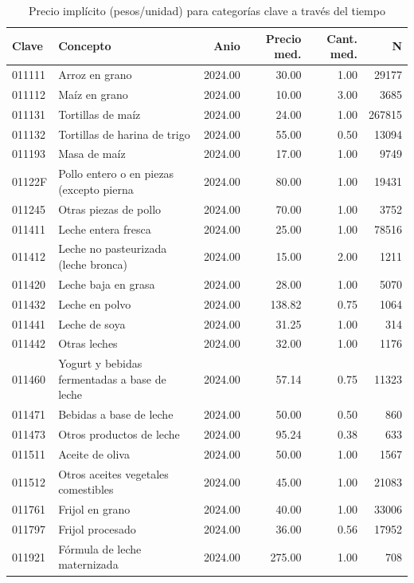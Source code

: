 \begin{table}[ht]
\centering
\caption{Precio impl\'icito (pesos/unidad) para categor\'ias clave a trav\'es del tiempo} 
\label{tab:20b_precio_categorias_clave}
\begin{tabular}{llrrrr}
  \toprule
Clave & Concepto & Anio & Precio med. & Cant. med. & N \\ 
  \midrule
011111 & Arroz en grano & 2024.00 & 30.00 & 1.00 & 29177 \\ 
  011112 & Maíz en grano & 2024.00 & 10.00 & 3.00 & 3685 \\ 
  011131 & Tortillas de maíz & 2024.00 & 24.00 & 1.00 & 267815 \\ 
  011132 & Tortillas de harina de trigo & 2024.00 & 55.00 & 0.50 & 13094 \\ 
  011193 & Masa de maíz & 2024.00 & 17.00 & 1.00 & 9749 \\ 
  01122F & Pollo entero o en piezas (excepto pierna & 2024.00 & 80.00 & 1.00 & 19431 \\ 
  011245 & Otras piezas de pollo & 2024.00 & 70.00 & 1.00 & 3752 \\ 
  011411 & Leche entera fresca & 2024.00 & 25.00 & 1.00 & 78516 \\ 
  011412 & Leche no pasteurizada (leche bronca) & 2024.00 & 15.00 & 2.00 & 1211 \\ 
  011420 & Leche baja en grasa & 2024.00 & 28.00 & 1.00 & 5070 \\ 
  011432 & Leche en polvo & 2024.00 & 138.82 & 0.75 & 1064 \\ 
  011441 & Leche de soya & 2024.00 & 31.25 & 1.00 & 314 \\ 
  011442 & Otras leches & 2024.00 & 32.00 & 1.00 & 1176 \\ 
  011460 & Yogurt y bebidas fermentadas a base de leche & 2024.00 & 57.14 & 0.75 & 11323 \\ 
  011471 & Bebidas a base de leche & 2024.00 & 50.00 & 0.50 & 860 \\ 
  011473 & Otros productos de leche & 2024.00 & 95.24 & 0.38 & 633 \\ 
  011511 & Aceite de oliva & 2024.00 & 50.00 & 1.00 & 1567 \\ 
  011512 & Otros aceites vegetales comestibles & 2024.00 & 45.00 & 1.00 & 21083 \\ 
  011761 & Frijol en grano & 2024.00 & 40.00 & 1.00 & 33006 \\ 
  011797 & Frijol procesado & 2024.00 & 36.00 & 0.56 & 17952 \\ 
  011921 & Fórmula de leche maternizada & 2024.00 & 275.00 & 1.00 & 708 \\ 

\end{tabular}
\end{table}
